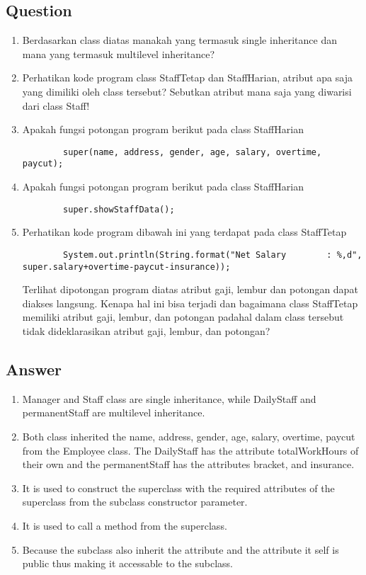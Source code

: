 \documentclass[12pt,titlepage]{article}
\begin{document}
\subsection{Question}
\begin{enumerate}
    \item Berdasarkan class diatas manakah yang termasuk single inheritance dan mana yang termasuk multilevel inheritance?
    \item Perhatikan kode program class StaffTetap dan StaffHarian, atribut apa saja yang dimiliki oleh class tersebut? Sebutkan atribut mana saja yang diwarisi dari class Staff!
    \item Apakah fungsi potongan program berikut pada class StaffHarian
    \begin{verbatim}
        super(name, address, gender, age, salary, overtime, paycut);
    \end{verbatim}
    \item Apakah fungsi potongan program berikut pada class StaffHarian
    \begin{verbatim}
        super.showStaffData();
    \end{verbatim}
    \item Perhatikan kode program dibawah ini yang terdapat pada class StaffTetap
    \begin{verbatim}
        System.out.println(String.format("Net Salary        : %,d", super.salary+overtime-paycut-insurance));
    \end{verbatim}
    Terlihat dipotongan program diatas atribut gaji, lembur dan potongan dapat diakses langsung. Kenapa hal ini bisa terjadi dan bagaimana class StaffTetap memiliki atribut gaji, lembur, dan potongan padahal dalam class tersebut tidak dideklarasikan atribut gaji, lembur, dan potongan?
\end{enumerate}

\subsection{Answer}
\begin{enumerate}
    \item Manager and Staff class are single inheritance, while DailyStaff and permanentStaff are multilevel inheritance.
    \item Both class inherited the name, address, gender, age, salary, overtime, paycut from the Employee class. The DailyStaff has the attribute totalWorkHours of their own and the permanentStaff has the attributes bracket, and insurance.
    \item It is used to construct the superclass with the required attributes of the superclass from the subclass constructor parameter.
    \item It is used to call a method from the superclass.
    \item Because the subclass also inherit the attribute and the attribute it self is public thus making it accessable to the subclass.
\end{enumerate}
\end{document}
